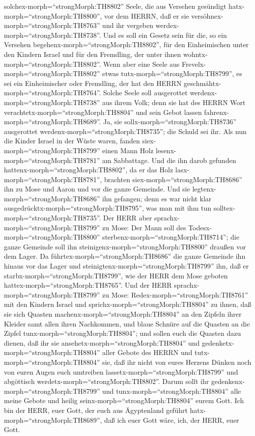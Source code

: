 solchex-morph=``strongMorph:TH8802'' Seele, die aus Versehen gesündigt
hatx-morph=``strongMorph:TH8800'', vor dem HERRN, daß er sie
versöhnex-morph=``strongMorph:TH8763'' und ihr vergeben
werdex-morph=``strongMorph:TH8738''.  Und es soll ein
Gesetz sein für die, so ein Versehen
begehenx-morph=``strongMorph:TH8802'', für den Einheimischen unter den
Kindern Israel und für den Fremdling, der unter ihnen
wohntx-morph=``strongMorph:TH8802''.  Wenn aber eine Seele
aus Frevelx-morph=``strongMorph:TH8802'' etwas
tutx-morph=``strongMorph:TH8799'', es sei ein Einheimischer oder
Fremdling, der hat den HERRN geschmähtx-morph=``strongMorph:TH8764''.
Solche Seele soll ausgerottet werdenx-morph=``strongMorph:TH8738'' aus
ihrem Volk;  denn sie hat des HERRN Wort
verachtetx-morph=``strongMorph:TH8804'' und sein Gebot lassen
fahrenx-morph=``strongMorph:TH8689''. Ja, sie
sollx-morph=``strongMorph:TH8736'' ausgerottet
werdenx-morph=``strongMorph:TH8735''; die Schuld sei ihr. 
Als nun die Kinder Israel in der Wüste waren, fanden
siex-morph=``strongMorph:TH8799'' einen Mann Holz
lesenx-morph=``strongMorph:TH8781'' am Sabbattage.  Und die
ihn darob gefunden hattenx-morph=``strongMorph:TH8802'', da er das Holz
lasx-morph=``strongMorph:TH8781'', brachten
siex-morph=``strongMorph:TH8686'' ihn zu Mose und Aaron und vor die
ganze Gemeinde.  Und sie
legtenx-morph=``strongMorph:TH8686'' ihn gefangen; denn es war nicht
klar ausgedrücktx-morph=``strongMorph:TH8795'', was man mit ihm tun
solltex-morph=``strongMorph:TH8735''.  Der HERR aber
sprachx-morph=``strongMorph:TH8799'' zu Mose: Der Mann soll des
Todesx-morph=``strongMorph:TH8800''
sterbenx-morph=``strongMorph:TH8714''; die ganze Gemeinde soll ihn
steinigenx-morph=``strongMorph:TH8800'' draußen vor dem Lager.
 Da führtex-morph=``strongMorph:TH8686'' die ganze Gemeinde
ihn hinaus vor das Lager und steinigtenx-morph=``strongMorph:TH8799''
ihn, daß er starbx-morph=``strongMorph:TH8799'', wie der HERR dem Mose
geboten hattex-morph=``strongMorph:TH8765''.  Und der HERR
sprachx-morph=``strongMorph:TH8799'' zu Mose: 
Redex-morph=``strongMorph:TH8761'' mit den Kindern Israel und
sprichx-morph=``strongMorph:TH8804'' zu ihnen, daß sie sich Quasten
machenx-morph=``strongMorph:TH8804'' an den Zipfeln ihrer Kleider samt
allen ihren Nachkommen, und blaue Schnüre auf die Quasten an die Zipfel
tunx-morph=``strongMorph:TH8804'';  und sollen euch die
Quasten dazu dienen, daß ihr sie ansehetx-morph=``strongMorph:TH8804''
und gedenketx-morph=``strongMorph:TH8804'' aller Gebote des HERRN und
tutx-morph=``strongMorph:TH8804'' sie, daß ihr nicht von eures Herzens
Dünken noch von euren Augen euch umtreiben
lassetx-morph=``strongMorph:TH8799'' und abgöttisch
werdetx-morph=``strongMorph:TH8802''.  Darum sollt ihr
gedenkenx-morph=``strongMorph:TH8799'' und
tunx-morph=``strongMorph:TH8804'' alle meine Gebote und heilig
seinx-morph=``strongMorph:TH8804'' eurem Gott.  Ich bin der
HERR, euer Gott, der euch aus Ägyptenland geführt
hatx-morph=``strongMorph:TH8689'', daß ich euer Gott wäre, ich, der
HERR, euer Gott.

